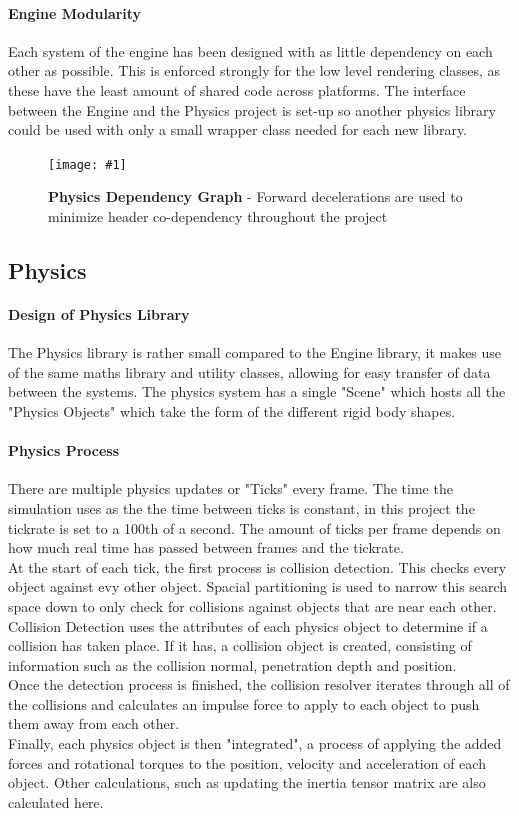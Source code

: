 \documentclass[conference]{acmsiggraph}
\newcommand{\figuremacroW}[4]{
	\begin{figure}[h] %
		\centering
		\texttt{[image: \#1]}
		\caption[#2]{\textbf{#2} - #3}
		\label{fig:#1}
	\end{figure}
}
\begin{document}
\paragraph{Engine Modularity}
Each system of the engine has been designed with as little dependency on each other as possible. This is enforced strongly for the low level rendering classes, as these have the least amount of shared code across platforms. The interface between the Engine and the Physics project is set-up so another physics library could be used with only a small wrapper class needed for each new library.

\figuremacroW
{physicsclasses}
{Physics Dependency Graph}
{Forward decelerations are used to minimize header co-dependency throughout the project}
{1.0}

\subsection{Physics}
\paragraph{Design of Physics Library}
The Physics library is rather small compared to the Engine library, it makes use of the same maths library and utility classes, allowing for easy transfer of data between the systems. The physics system has a single "Scene" which hosts all the "Physics Objects" which take the form of the different rigid body shapes.

\paragraph{Physics Process}
There are multiple physics updates or "Ticks" every frame. The time the simulation uses as the the time between ticks is constant, in this project the tickrate	is set to a 100th of a second. The amount of ticks per frame depends on how much real time has passed between frames and the tickrate.\\	
At the start of each tick, the first process is collision detection. This checks every object against evy other object. Spacial partitioning is used to narrow this search space down to only check for collisions against objects that are near each other.
\\
Collision Detection uses the attributes of each physics object to determine if a collision has taken place. If it has, a collision object is created, consisting of information such as the collision normal, penetration depth and position.
\\
Once the detection process is finished, the collision resolver iterates through all of the collisions and calculates an impulse force to apply to each object to push them away from each other.
\\
Finally, each physics object is then "integrated", a process of applying the added forces and rotational torques to the position, velocity and acceleration of each object. Other calculations, such as updating the inertia tensor matrix are also calculated here.
\end{document}
